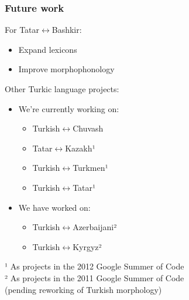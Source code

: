 \documentclass[10pt,xetex]{beamer} %
\begin{document}

\begin{frame}
  \frametitle{Future work}

\begin{block}{For Tatar$\leftrightarrow$Bashkir:}
  \begin{itemize}
    \item Expand lexicons 
    \item Improve morphophonology
  \end{itemize}
\end{block}

\begin{block}{Other Turkic language projects:}
  \begin{itemize}
    \item We're currently working on:

    \begin{itemize}
      \item Turkish$\leftrightarrow$Chuvash
      \item Tatar$\leftrightarrow$Kazakh¹
      \item Turkish$\leftrightarrow$Turkmen¹
      \item Turkish$\leftrightarrow$Tatar¹
    \end{itemize}

    \item We have worked on: 
    \begin{itemize}
      \item Turkish$\leftrightarrow$Azerbaijani²
      \item Turkish$\leftrightarrow$Kyrgyz²
    \end{itemize}
  \end{itemize}
  ¹ As projects in the 2012 Google Summer of Code \\
  ² As projects in the 2011 Google Summer of Code \\
  \hspace{3ex} (pending reworking of Turkish morphology)
\end{block}

\end{frame}
\end{document}
